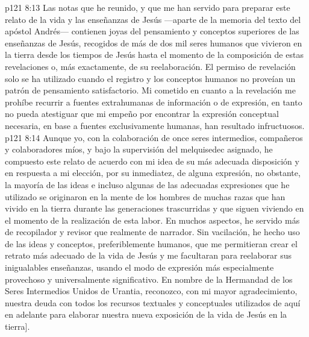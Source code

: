 \vs p121 8:13 Las notas que he reunido, y que me han servido para preparar este relato de la vida y las enseñanzas de Jesús ---aparte de la memoria del texto del apóstol Andrés--- contienen joyas del pensamiento y conceptos superiores de las enseñanzas de Jesús, recogidos de más de dos mil seres humanos que vivieron en la tierra desde los tiempos de Jesús hasta el momento de la composición de estas revelaciones o, más exactamente, de su reelaboración. El permiso de revelación solo se ha utilizado cuando el registro y los conceptos humanos no proveían un patrón de pensamiento satisfactorio. Mi cometido en cuanto a la revelación me prohíbe recurrir a fuentes extrahumanas de información o de expresión, en tanto no pueda atestiguar que mi empeño por encontrar la expresión conceptual necesaria, en base a fuentes exclusivamente humanas, han resultado infructuosos.
\vs p121 8:14 Aunque yo, con la colaboración de once seres intermedios, compañeros y colaboradores míos, y bajo la supervisión del melquisedec asignado, he compuesto este relato de acuerdo con mi idea de su más adecuada disposición y en respuesta a mi elección, por su inmediatez, de alguna expresión, no obstante, la mayoría de las ideas e incluso algunas de las adecuadas expresiones que he utilizado se originaron en la mente de los hombres de muchas razas que han vivido en la tierra durante las generaciones trascurridas y que siguen viviendo en el momento de la realización de esta labor. En muchos aspectos, he servido más de recopilador y revisor que realmente de narrador. Sin vacilación, he hecho uso de las ideas y conceptos, preferiblemente humanos, que me permitieran crear el retrato más adecuado de la vida de Jesús y me facultaran para reelaborar sus inigualables enseñanzas, usando el modo de expresión más especialmente provechoso y universalmente significativo. En nombre de la Hermandad de los Seres Intermedios Unidos de Urantia, reconozco, con mi mayor agradecimiento, nuestra deuda con todos los recursos textuales y conceptuales utilizados de aquí en adelante para elaborar nuestra nueva exposición de la vida de Jesús en la tierra].

